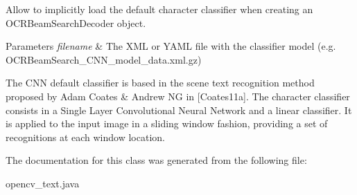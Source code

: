 Allow to implicitly load the default character classifier when creating an O\+C\+R\+Beam\+Search\+Decoder object. 


\begin{DoxyParams}{Parameters}
{\em filename} & The X\+ML or Y\+A\+ML file with the classifier model (e.\+g. O\+C\+R\+Beam\+Search\+\_\+\+C\+N\+N\+\_\+model\+\_\+data.\+xml.\+gz) \\
\hline
\end{DoxyParams}
The C\+NN default classifier is based in the scene text recognition method proposed by Adam Coates \& Andrew NG in \mbox{[}Coates11a\mbox{]}. The character classifier consists in a Single Layer Convolutional Neural Network and a linear classifier. It is applied to the input image in a sliding window fashion, providing a set of recognitions at each window location. 

The documentation for this class was generated from the following file\+:\begin{DoxyCompactItemize}
\item 
opencv\+\_\+text.\+java\end{DoxyCompactItemize}
